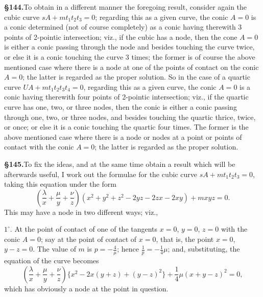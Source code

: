 \documentclass[11pt,a4paper]{article}
\begin{document}
\textbf{\S 144.}\quad To obtain in a different manner the foregoing result, consider again the cubic curve $sA + mt_1t_2t_3 = 0$; regarding this as a given curve, the conic $A = 0$ is a conic determined (not of course completely) as a conic having therewith 3 points of 2-pointic intersection; viz., if the cubic has a node, then the cone $A = 0$ is either a conic passing through the node and besides touching the curve twice, or else it is a conic touching the curve 3 times; the former is of course the above mentioned case where there is a node at one of the points of contact on the conic $A = 0$; the latter is regarded as the proper solution. So in the case of a quartic curve $UA + mt_1t_2t_3t_4 = 0$, regarding this as a given curve, the conic $A = 0$ is a conic having therewith four points of 2-pointic intersection; viz., if the quartic curve has one, two, or three nodes, then the conic is either a conic passing through one, two, or three nodes, and besides touching the quartic thrice, twice, or once; or else it is a conic touching the quartic four times. The former is the above mentioned case where there is a node or nodes at a point or points of contact with the conic $A = 0$; the latter is regarded as the proper solution.

\textbf{\S 145.}\quad To fix the ideas, and at the same time obtain a result which will be afterwards useful, I work out the formulae for the cubic curve $sA + mt_1t_2t_3 = 0$, taking this equation under the form
\[
\left(\frac{\lambda}{x} + \frac{\mu}{y} + \frac{\nu}{z}\right)(x^2 + y^2 + z^2 - 2yz - 2zx - 2xy) + mxyz = 0.
\]
This may have a node in two different ways; viz.,

$1^{\circ}$. At the point of contact of one of the tangents $x = 0$, $y = 0$, $z = 0$ with the conic $A = 0$; say at the point of contact of $x = 0$, that is, the point $x = 0$, $y - z = 0$. The value of $m$ is $p = -\frac{4}{\mu}$; hence $\frac{1}{p} = -\frac{1}{4}\mu$; and, substituting, the equation of the curve becomes
\[
\left(\frac{\lambda}{x} + \frac{\mu}{y} + \frac{\nu}{z}\right)\{x^2 - 2x(y + z) + (y - z)^2\} + \frac{1}{4}\mu(x + y - z)^2 = 0,
\]
which has obviously a node at the point in question.
\end{document}
